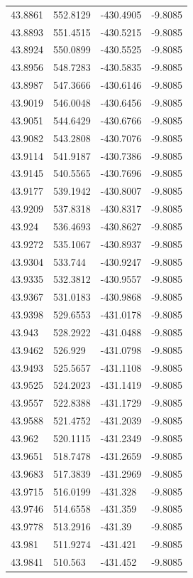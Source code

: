 \begin{table}[H]
\begin{tabular}{llll}
43.8861 & 552.8129 & -430.4905 & -9.8085 \\
43.8893 & 551.4515 & -430.5215 & -9.8085 \\
43.8924 & 550.0899 & -430.5525 & -9.8085 \\
43.8956 & 548.7283 & -430.5835 & -9.8085 \\
43.8987 & 547.3666 & -430.6146 & -9.8085 \\
43.9019 & 546.0048 & -430.6456 & -9.8085 \\
43.9051 & 544.6429 & -430.6766 & -9.8085 \\
43.9082 & 543.2808 & -430.7076 & -9.8085 \\
43.9114 & 541.9187 & -430.7386 & -9.8085 \\
43.9145 & 540.5565 & -430.7696 & -9.8085 \\
43.9177 & 539.1942 & -430.8007 & -9.8085 \\
43.9209 & 537.8318 & -430.8317 & -9.8085 \\
43.924 & 536.4693 & -430.8627 & -9.8085 \\
43.9272 & 535.1067 & -430.8937 & -9.8085 \\
43.9304 & 533.744 & -430.9247 & -9.8085 \\
43.9335 & 532.3812 & -430.9557 & -9.8085 \\
43.9367 & 531.0183 & -430.9868 & -9.8085 \\
43.9398 & 529.6553 & -431.0178 & -9.8085 \\
43.943 & 528.2922 & -431.0488 & -9.8085 \\
43.9462 & 526.929 & -431.0798 & -9.8085 \\
43.9493 & 525.5657 & -431.1108 & -9.8085 \\
43.9525 & 524.2023 & -431.1419 & -9.8085 \\
43.9557 & 522.8388 & -431.1729 & -9.8085 \\
43.9588 & 521.4752 & -431.2039 & -9.8085 \\
43.962 & 520.1115 & -431.2349 & -9.8085 \\
43.9651 & 518.7478 & -431.2659 & -9.8085 \\
43.9683 & 517.3839 & -431.2969 & -9.8085 \\
43.9715 & 516.0199 & -431.328 & -9.8085 \\
43.9746 & 514.6558 & -431.359 & -9.8085 \\
43.9778 & 513.2916 & -431.39 & -9.8085 \\
43.981 & 511.9274 & -431.421 & -9.8085 \\
43.9841 & 510.563 & -431.452 & -9.8085 \\

\end{tabular}
\end{table}
